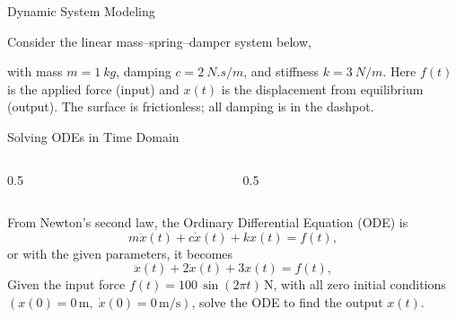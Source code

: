 \documentclass[12pt, aspectratio=169]{beamer}
\begin{document}
\begin{frame}{Dynamic System Modeling}
    \begin{center}
        Consider the linear mass--spring--damper system below,\newline 
        \massSpringDamper[1.0] 
    \end{center}
    with mass $m = \SI{1}{kg}$, damping $c = \SI{2}{N.s/m}$, and stiffness $k = \SI{3}{N/m}$.\newline
    Here $f(t)$ is the applied force (input) and $x(t)$ is the displacement from equilibrium (output). The surface is frictionless; all damping is in the dashpot.
\end{frame}

\begin{frame}{Solving ODEs in Time Domain}
    \begin{columns}
        \begin{column}{0.5\columnwidth}
            \centering
            \massSpringDamper[0.75] 
        \end{column}
        \begin{column}{0.5\columnwidth}
            \centering
        \end{column}
    \end{columns}
    \vspace{1em}
    From Newton's second law, the Ordinary Differential Equation (ODE) is
    \[
        m \ddot{x}(t) + c\dot{x}(t) + kx(t) = f(t), 
    \] or with the given parameters, it becomes
    \[
        \ddot{x}(t) + 2\dot{x}(t) + 3x(t) = f(t), 
    \]
    Given the input force $f(t) = 100\,\sin(2\pi t)\,\text{N}$, with all zero initial conditions $(x(0) = 0\,\text{m}, \; \dot{x}(0) = 0\,\text{m/s})$, solve the ODE to find the output $x(t)$.
\end{frame}
\end{document}
